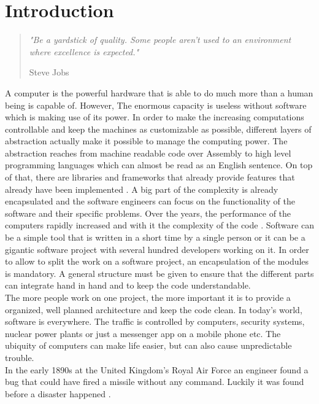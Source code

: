 \chapter{Introduction}

\begin{quote}
\centering 
\em %
"Be a yardstick of quality. Some people aren't used to an environment where excellence is expected."

\medskip
\raggedleft
Steve Jobs
\end{quote}
\vspace{10 mm}

A computer is the powerful hardware that is able to do much more than a human being is capable of. However, The enormous capacity is useless without software which is making use of its power. In order to make the increasing computations controllable and keep the machines as customizable as possible, different layers of abstraction actually make it possible to manage the computing power. The abstraction reaches from machine readable code over Assembly to high level programming languages which can almost be read as an English sentence. On top of that, there are libraries and frameworks that already provide features that already have been implemented \cite{Martin:2008:CCH:1388398}. A big part of the complexity is already encapsulated and the software engineers can focus on the functionality of the software and their specific problems.
\bigbreak
Over the years, the performance of the computers rapidly increased and with it the complexity of the code \cite{wirth2008brief}.
Software can be a simple tool that is written in a short time by a single person or it can be a gigantic software project with several hundred developers working on it\cite{cusumano1997microsoft}.
In order to allow to split the work on a software project, an encapsulation of the modules is mandatory. A general structure must be given to ensure that the different parts can integrate hand in hand and to keep the code understandable.\\
The more people work on one project, the more important it is to provide a organized, well planned architecture and keep the code clean.
\bigbreak
In today's world, software is everywhere. The traffic is controlled by computers, security systems, nuclear power plants or just a messenger app on a mobile phone etc. 
The ubiquity of computers can make life easier, but can also cause unpredictable trouble.\\
In the early 1890s at the United Kingdom's Royal Air Force an engineer found a bug that could have fired a missile without any command. Luckily it was found before a disaster happened \cite{ross2005exterminators}.
